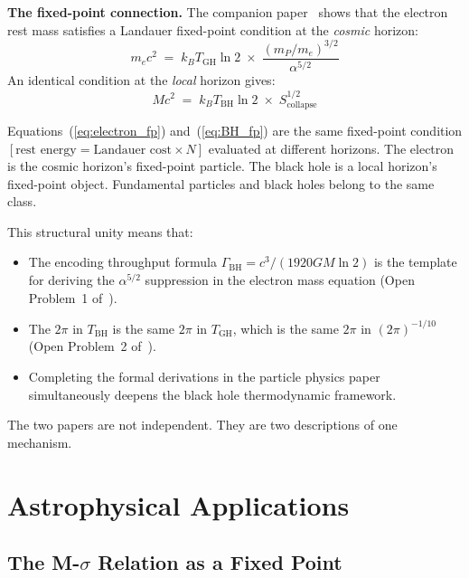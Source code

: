 \documentclass[12pt,letterpaper]{article}
\begin{document}
\textbf{The fixed-point connection.}
The companion paper~\cite{MahaffeyParticle2026} shows that the
electron rest mass satisfies a Landauer fixed-point condition
at the \emph{cosmic} horizon:
\begin{equation}
m_e c^2 \;=\; k_B T_\text{GH}\ln 2 \;\times\; \frac{(m_P/m_e)^{3/2}}{\alpha^{5/2}}
\label{eq:electron_fp}
\end{equation}
An identical condition at the \emph{local} horizon gives:
\begin{equation}
Mc^2 \;=\; k_B T_\text{BH}\ln 2 \;\times\; S_\text{collapse}^{1/2}
\label{eq:BH_fp}
\end{equation}

Equations~(\ref{eq:electron_fp}) and~(\ref{eq:BH_fp}) are the same
fixed-point condition $[\text{rest energy} = \text{Landauer cost}\times N]$
evaluated at different horizons.
The electron is the cosmic horizon's fixed-point particle.
The black hole is a local horizon's fixed-point object.
Fundamental particles and black holes belong to the same class.

This structural unity means that:
\begin{itemize}
\item The encoding throughput formula $\Gamma_\text{BH} = c^3/(1920GM\ln 2)$
  is the template for deriving the $\alpha^{5/2}$ suppression
  in the electron mass equation (Open Problem~1 of~\cite{MahaffeyParticle2026}).
\item The $2\pi$ in $T_\text{BH}$ is the same $2\pi$ in $T_\text{GH}$,
  which is the same $2\pi$ in $(2\pi)^{-1/10}$
  (Open Problem~2 of~\cite{MahaffeyParticle2026}).
\item Completing the formal derivations in the particle physics paper
  simultaneously deepens the black hole thermodynamic framework.
\end{itemize}

The two papers are not independent. They are two descriptions of one mechanism.

\section{Astrophysical Applications}

\subsection{The M-$\sigma$ Relation as a Fixed Point}
\end{document}
